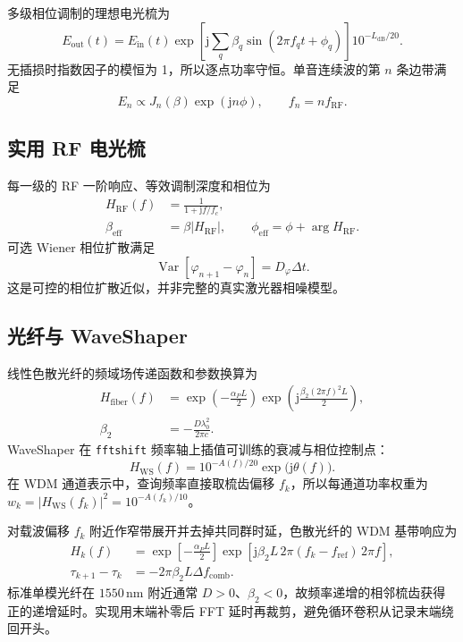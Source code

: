 \documentclass[11pt,a4paper,UTF8]{ctexart}
\newcommand{\pkg}[1]{\texttt{#1}}
\begin{document}
多级相位调制的理想电光梳为
\begin{equation}
E_{\mathrm{out}}(t)=E_{\mathrm{in}}(t)
\exp\!\left[\mathrm{j}\sum_q\beta_q\sin(2\pi f_qt+\phi_q)\right]
10^{-L_{\mathrm{dB}}/20}.
\end{equation}
无插损时指数因子的模恒为 1，所以逐点功率守恒。单音连续波的第 $n$ 条边带满足
\begin{equation}
E_n\propto J_n(\beta)\exp(\mathrm{j}n\phi),\qquad f_n=nf_{\mathrm{RF}}.
\end{equation}

\subsection{实用 RF 电光梳}
每一级的 RF 一阶响应、等效调制深度和相位为
\begin{align}
H_{\mathrm{RF}}(f)&=\frac{1}{1+\mathrm{j}f/f_c},\\
\beta_{\mathrm{eff}}&=\beta|H_{\mathrm{RF}}|,\qquad
\phi_{\mathrm{eff}}=\phi+\arg H_{\mathrm{RF}}.
\end{align}
可选 Wiener 相位扩散满足
\begin{equation}
\operatorname{Var}\!\left[\varphi_{n+1}-\varphi_n\right]=D_{\varphi}\Delta t.
\end{equation}
这是可控的相位扩散近似，并非完整的真实激光器相噪模型。

\subsection{光纤与 WaveShaper}
线性色散光纤的频域场传递函数和参数换算为
\begin{align}
H_{\mathrm{fiber}}(f)&=
\exp\!\left(-\frac{\alpha_PL}{2}\right)
\exp\!\left(\mathrm{j}\frac{\beta_2(2\pi f)^2L}{2}\right),\\
\beta_2&=-\frac{D\lambda_0^2}{2\pi c}.
\end{align}
WaveShaper 在 \pkg{fftshift} 频率轴上插值可训练的衰减与相位控制点：
\begin{equation}
H_{\mathrm{WS}}(f)=10^{-A(f)/20}\exp\!\bigl(\mathrm{j}\theta(f)\bigr).
\end{equation}
在 WDM 通道表示中，查询频率直接取梳齿偏移 $f_k$，所以每通道功率权重为 $w_k=|H_{\mathrm{WS}}(f_k)|^2=10^{-A(f_k)/10}$。

对载波偏移 $f_k$ 附近作窄带展开并去掉共同群时延，色散光纤的 WDM 基带响应为
\begin{align}
H_k(f)&=\exp\!\left[-\frac{\alpha_PL}{2}\right]
\exp\!\left[\mathrm{j}\beta_2L\,2\pi(f_k-f_{\mathrm{ref}})\,2\pi f\right],\\
\tau_{k+1}-\tau_k&=-2\pi\beta_2L\Delta f_{\mathrm{comb}}.
\end{align}
标准单模光纤在 $1550\,\mathrm{nm}$ 附近通常 $D>0$、$\beta_2<0$，故频率递增的相邻梳齿获得正的递增延时。实现用末端补零后 FFT 延时再裁剪，避免循环卷积从记录末端绕回开头。
\end{document}
